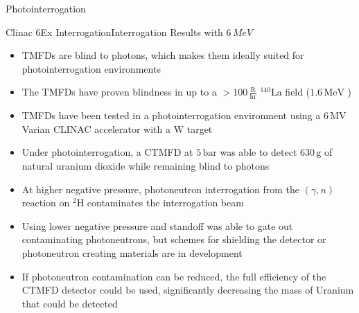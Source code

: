 \documentclass{puposter}
\begin{document}
\begin{pucol}{5}{12}
  \def\numheadings{2}
  \begin{pucell}{5}{8}{Photointerrogation}{}
    \begin{pucol}{2}{8}
      \begin{pucell}{2}{5}{Clinac 6Ex Interrogation}{Interrogation Results with $6\,MeV$ \scalebox{2.0}{$\gamma$}}
        \begin{itemize}
          \item TMFDs are blind to photons, which makes them ideally suited for photointerrogation environments
          \item The TMFDs have proven blindness in up to a $>100\,\mathrm{\frac{R}{hr}}$ $\mathrm{^{140}La}$ field ($1.6\,\mathrm{MeV}$ \scalebox{2.0}{$\gamma$})
          \item TMFDs have been tested in a photointerrogation environment using a $6\,\mathrm{MV}$ Varian CLINAC accelerator with a $\mathrm{W}$ target
          \item Under photointerrogation, a CTMFD at $5\,\mathrm{bar}$ was able to detect $630\,\mathrm{g}$ of natural uranium dioxide while remaining blind to photons
          \item At higher negative pressure, photoneutron interrogation from the $\left(\gamma,n\right)$ reaction on $\mathrm{^{2}H}$ contaminates the interrogation beam
          \item Using lower negative pressure and standoff was able to gate out contaminating photoneutrons, but schemes for shielding the detector or photoneutron creating materials are in development
          \item If photoneutron contamination can be reduced, the full efficiency of the CTMFD detector could be used, significantly decreasing the mass of Uranium that could be detected
        \end{itemize}
      \end{pucell} \\
      \vspace*{\fill}
      \begin{pucell}{2}{3}{}{}
      \end{pucell}
    \end{pucol}%
    \begin{pucol}{3}{8}
      \begin{pucell}{3}{3}{}{}

\end{pucell}
\end{pucol}
\end{pucell}
\end{pucol}
\end{document}
